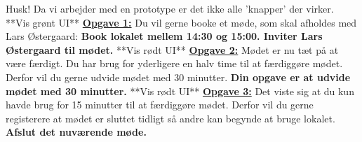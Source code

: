Husk! Da vi arbejder med en prototype er det ikke alle ’knapper’ der virker. 
\newline\newline
**Vis grønt UI**
\newline\newline
\underline{\textbf{Opgave 1:}}
Du vil gerne booke et møde, som skal afholdes med Lars Østergaard:
\newline
\textbf{Book lokalet mellem 14:30 og 15:00. Inviter Lars Østergaard til mødet.}
\newline\newline
**Vis rødt UI**
\newline\newline
\underline{\textbf{Opgave 2:}}
Mødet er nu tæt på at være færdigt. Du har brug for yderligere en halv time til at færdiggøre mødet.  Derfor vil du gerne udvide mødet med 30 minutter. 
\newline
\textbf{Din opgave er at udvide mødet med 30 minutter. }
\newline\newline
**Vis rødt UI**
\newline\newline
\underline{\textbf{Opgave 3:}}
Det viste sig at du kun havde brug for 15 minutter til at færdiggøre mødet. Derfor vil du gerne registerere at mødet er sluttet tidligt så andre kan begynde at bruge lokalet.
\newline
\textbf{Afslut det nuværende møde. }